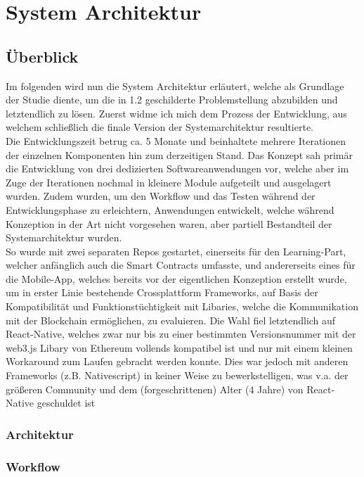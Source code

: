 \chapter{System Architektur}
\label{kap:Kapitel03}

\section{Überblick}
Im folgenden wird nun die System Architektur erläutert, welche als Grundlage der
Studie diente, um die in 1.2 geschilderte Problemstellung abzubilden und
letztendlich zu lösen. Zuerst widme ich mich dem Prozess der Entwicklung, aus
welchem schließlich die finale Version der Systemarchitektur resultierte. \\
Die Entwicklungszeit betrug ca. 5 Monate und beinhaltete mehrere Iterationen der
einzelnen Komponenten hin zum derzeitigen Stand. Das Konzept sah primär die
Entwicklung von drei dedizierten Softwareanwendungen vor, welche aber im Zuge
der Iterationen nochmal in kleinere Module aufgeteilt und ausgelagert wurden.
Zudem wurden, um den Workflow und das Testen während der Entwicklungsphase zu
erleichtern, Anwendungen entwickelt, welche während Konzeption in der Art nicht
vorgesehen waren, aber partiell Bestandteil der Systemarchitektur wurden. \\
So wurde mit zwei separaten Repos gestartet, einerseits für den Learning-Part,
welcher anfänglich auch die Smart Contracts umfasste, und andererseits eines für
die Mobile-App, welches bereits vor der eigentlichen Konzeption erstellt wurde,
um in erster Linie bestehende Crossplattform Frameworks, auf Basis der
Kompatibilität und Funktionstüchtigkeit mit Libaries, welche die Kommunikation
mit der Blockchain ermöglichen, zu evaluieren. Die Wahl fiel letztendlich auf
React-Native, welches zwar nur bis zu einer bestimmten Versionsnummer mit der
web3.js Libary von Ethereum vollends kompatibel ist und nur mit einem kleinen
Workaround zum Laufen gebracht werden konnte. Dies war jedoch mit anderen
Frameworks (z.B. Nativescript) in keiner Weise zu bewerkstelligen, was v.a. der
größeren Community und dem (forgeschrittenen) Alter (4 Jahre) von React-Native
geschuldet ist \\
\subsection{Architektur}
\subsection{Workflow}





